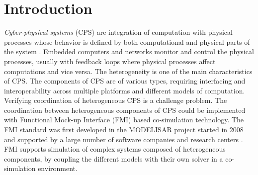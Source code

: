 \section{Introduction}

\textit{Cyber-physical systems} (CPS) are integration of computation with physical processes whose behavior is defined by both computational and physical parts of the system \cite{Zanero17}. Embedded computers and networks monitor and control the physical processes, usually with feedback loops where physical processes affect computations and vice versa. The heterogeneity is one of the main characteristics of CPS. The components of CPS are of various types, requiring interfacing and interoperability across multiple platforms and different models of computation. Verifying coordination of heterogeneous CPS is a challenge problem. The coordination between heterogeneous components of CPS could be implemented with Functional Mock-up Interface (FMI) based co-simulation technology. The FMI standard was first developed in the MODELISAR project started in 2008 and supported by a large number of software companies and research centers \cite{ClauMODELISAR}. FMI supports simulation of complex systems composed of heterogeneous components, by coupling the different models with their own solver in a co-simulation environment.

